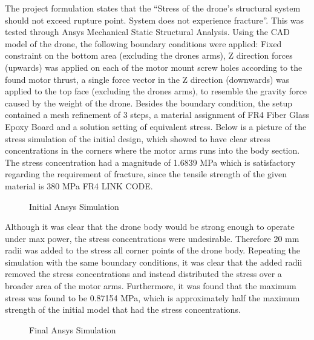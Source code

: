 \documentclass[12pt]{article}
\begin{document}
The project formulation states that the “Stress of the drone’s structural system should not exceed rupture point. System does not experience fracture”. This was tested through Ansys Mechanical Static Structural Analysis. Using the CAD model of the drone, the following boundary conditions were applied: Fixed constraint on the bottom area (excluding the drones arms), Z direction forces (upwards) was applied on each of the motor mount screw holes according to the found motor thrust, a single force vector in the Z direction (downwards) was applied to the top face (excluding the drones arms), to resemble the gravity force caused by the weight of the drone. Besides the boundary condition, the setup contained a mesh refinement of 3 steps, a material assignment of FR4 Fiber Glass Epoxy Board and a solution setting of equivalent stress. Below is a picture of the stress simulation of the initial design, which showed to have clear stress concentrations in the corners where the motor arms runs into the body section. The stress concentration had a magnitude of 1.6839 MPa which is satisfactory regarding the requirement of fracture, since the tensile strength of the given material is 380 MPa FR4 LINK CODE. 

\begin{figure}[H]%
    \centering
    \caption{Initial Ansys Simulation}%
    \label{fig:example}%
\end{figure}

Although it was clear that the drone body would be strong enough to operate under max power, the stress concentrations were undesirable. Therefore 20 mm radii was added to the stress all corner points of the drone body. Repeating the simulation with the same boundary conditions, it was clear that the added radii removed the stress concentrations and instead distributed the stress over a broader area of the motor arms. Furthermore, it was found that the maximum stress was found to be 0.87154 MPa, which is approximately half the maximum strength of the initial model that had the stress concentrations.

\begin{figure}[H]%
    \centering
    \caption{Final Ansys Simulation}%
    \label{fig:example}%
\end{figure}
\end{document}
